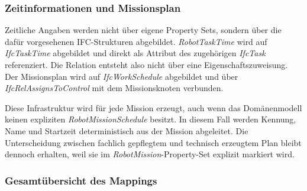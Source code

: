 \subsubsection{Zeitinformationen und Missionsplan}

Zeitliche Angaben werden nicht über eigene Property Sets, sondern über die dafür vorgesehenen
IFC-Strukturen abgebildet. \textit{RobotTaskTime} wird auf \textit{IfcTaskTime} abgebildet und
direkt als Attribut des zugehörigen \textit{IfcTask} referenziert. Die Relation entsteht also nicht
über eine Eigenschaftszuweisung. Der Missionsplan wird auf \textit{IfcWorkSchedule} abgebildet und
über \textit{IfcRelAssignsToControl} mit dem Missionsknoten verbunden.

Diese Infrastruktur wird für jede Mission erzeugt, auch wenn das Domänenmodell keinen expliziten
\textit{RobotMissionSchedule} besitzt. In diesem Fall werden Kennung, Name und Startzeit
deterministisch aus der Mission abgeleitet. Die Unterscheidung zwischen fachlich gepflegtem und
technisch erzeugtem Plan bleibt dennoch erhalten, weil sie im \textit{RobotMission}-Property-Set
explizit markiert wird.

\subsubsection{Gesamtübersicht des Mappings}

